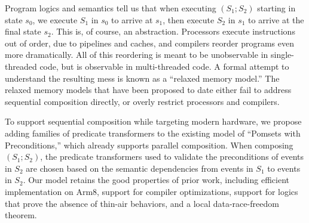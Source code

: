 
Program logics and semantics tell us that when executing $(S_1; S_2)$ starting in state $s_0$,
we execute $S_1$ in $s_0$ to arrive at $s_1$, then execute $S_2$ in $s_1$ to
arrive at the final state $s_2$.  This is, of course, an abstraction.  Processors
execute instructions out of order, due to pipelines and caches, and compilers
reorder programs even more dramatically.  All of this reordering is meant to
be unobservable in single-threaded code, but is observable in multi-threaded code.
A formal attempt to understand the resulting mess is known
as a ``relaxed memory model.''  The relaxed memory models that have been
proposed to date either fail to address sequential composition directly, or overly
restrict processors and compilers.

To support sequential composition while targeting modern hardware, we propose adding families of predicate
transformers to the existing model of ``Pomsets with Preconditions,'' which
already supports parallel composition.  When composing $(S_1;S_2)$, the predicate
transformers used to validate the preconditions of events in $S_2$ are chosen
based on the semantic dependencies from events in $S_1$ to events in $S_2$.  Our model
retains the good properties of prior work, including efficient
implementation on Arm8, support for compiler optimizations, support for
logics that prove the absence of thin-air behaviors, and a local data-race-freedom theorem.


\endinput

